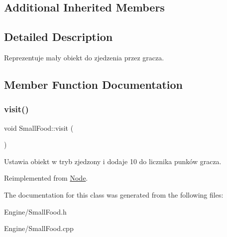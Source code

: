 \subsection*{Additional Inherited Members}


\subsection{Detailed Description}
Reprezentuje mały obiekt do zjedzenia przez gracza. 

\subsection{Member Function Documentation}
\mbox{\label{classSmallFood_a4b7a54f8b6c4045dba6c50f117923c01}} 
\subsubsection{\texorpdfstring{visit()}{visit()}}
{\footnotesize\ttfamily void Small\+Food\+::visit (\begin{DoxyParamCaption}{ }\end{DoxyParamCaption})\hspace{0.3cm}{\ttfamily [virtual]}}

Ustawia obiekt w tryb zjedzony i dodaje 10 do licznika punków gracza. 

Reimplemented from \hyperlink{classNode_a7cb557af2f8c31fa43fc4c75134750e8}{Node}.



The documentation for this class was generated from the following files\+:\begin{DoxyCompactItemize}
\item 
Engine/Small\+Food.\+h\item 
Engine/Small\+Food.\+cpp\end{DoxyCompactItemize}
